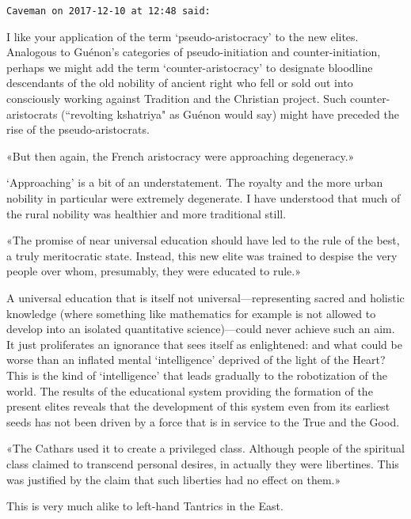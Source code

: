 \begin{footnotesize}
\begin{sffamily}
\hfill

\texttt{Caveman on 2017-12-10 at 12:48 said: }

I like your application of the term `pseudo-aristocracy' to the new elites. Analogous to Guénon's categories of pseudo-initiation and counter-initiation, perhaps we might add the term `counter-aristocracy' to designate bloodline descendants of the old nobility of ancient right who fell or sold out into consciously working against Tradition and the Christian project. Such counter-aristocrats (``revolting kshatriya" as Guénon would say) might have preceded the rise of the pseudo-aristocrats. 

«But then again, the French aristocracy were approaching degeneracy.»

`Approaching' is a bit of an understatement. The royalty and the more urban nobility in particular were extremely degenerate. I have understood that much of the rural nobility was healthier and more traditional still. 

«The promise of near universal education should have led to the rule of the best, a truly meritocratic state. Instead, this new elite was trained to despise the very people over whom, presumably, they were educated to rule.»

A universal education that is itself not universal—representing sacred and holistic knowledge (where something like mathematics for example is not allowed to develop into an isolated quantitative science)—could never achieve such an aim. It just proliferates an ignorance that sees itself as enlightened: and what could be worse than an inflated mental `intelligence' deprived of the light of the Heart? This is the kind of `intelligence' that leads gradually to the robotization of the world. The results of the educational system providing the formation of the present elites reveals that the development of this system even from its earliest seeds has not been driven by a force that is in service to the True and the Good.

«The Cathars used it to create a privileged class. Although people of the spiritual class claimed to transcend personal desires, in actually they were libertines. This was justified by the claim that such liberties had no effect on them.»

This is very much alike to left-hand Tantrics in the East.


\end{sffamily}\end{footnotesize}
